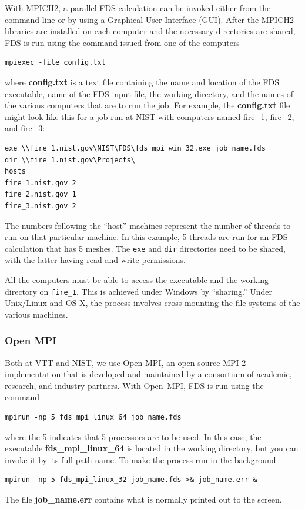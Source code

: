 \documentclass[11pt]{book}
\newcommand{\ct}{\tt\small}
\begin{document}
With MPICH2, a parallel FDS calculation can be invoked either
from the command line or by using a Graphical User Interface
(GUI). After the MPICH2 libraries are installed on each computer and
the necessary directories are shared, FDS is run using the command
issued from one of the computers
\begin{verbatim}
mpiexec -file config.txt
\end{verbatim}
where {\bf config.txt} is a text file containing the name and location
of the FDS executable, name of the FDS input file, the working directory,
and the names of the various computers that are to run the job. For
example, the {\bf config.txt} file might look like this for a job run at NIST with computers named
fire\_1, fire\_2, and fire\_3:
\begin{verbatim}
exe \\fire_1.nist.gov\NIST\FDS\fds_mpi_win_32.exe job_name.fds
dir \\fire_1.nist.gov\Projects\
hosts
fire_1.nist.gov 2
fire_2.nist.gov 1
fire_3.nist.gov 2
\end{verbatim}
The numbers following the ``host'' machines represent the number of threads to run on that particular machine. In this
example, 5 threads are run for an FDS calculation that has 5 meshes. The {\ct exe} and {\ct dir} directories need to be shared, with the
latter having read and write permissions.

\begin{warning}
\noindent
All the computers must be able to access the executable and the working directory on {\ct fire\_1}.
This is achieved under Windows by ``sharing.'' Under Unix/Linux and OS X, the process involves cross-mounting the file
systems of the various machines.
\end{warning}


\subsubsection{Open MPI}

Both at VTT and NIST, we use Open MPI, an open source MPI-2 implementation that is developed and maintained by a consortium of academic,
research, and industry partners.
With Open~MPI, FDS is run using the command
\begin{verbatim}
mpirun -np 5 fds_mpi_linux_64 job_name.fds
\end{verbatim}
where the 5 indicates that 5 processors are to be used. In this case, the executable {\bf fds\_mpi\_linux\_64} is located in the
working directory, but you can invoke it by its full path name. To make the process run in the background
\begin{verbatim}
mpirun -np 5 fds_mpi_linux_32 job_name.fds >& job_name.err &
\end{verbatim}
The file {\bf job\_name.err} contains what is normally printed out to the screen.
\end{document}
